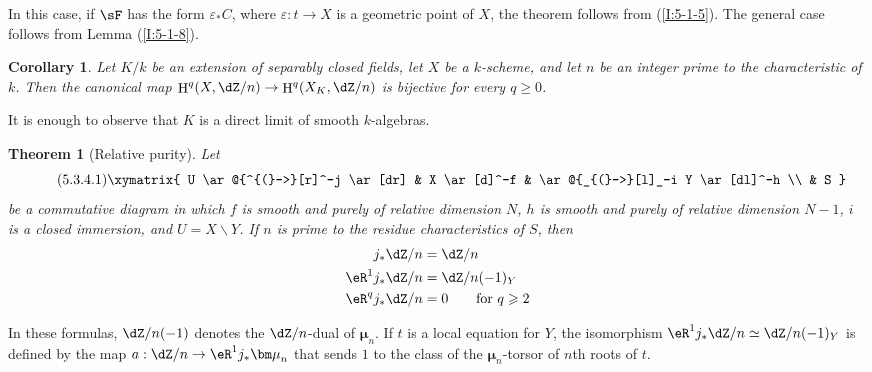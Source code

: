 \documentclass[12pt,oneside,english]{smfbook}
\DeclareMathOperator{\h}{H}
\newcommand{\dmu}{{\bm\mu}}
\newcounter{char}
\renewcommand{\setminus}{\smallsetminus}
\newtheorem{corollary}[subsubsection]{Corollary}
\newtheorem{theorem}[subsubsection]{Theorem}
\begin{document}
In this case, if $\sF$ has the form $\varepsilon_*C$, where $\varepsilon:t\to X$ is a geometric point of $X$, the theorem follows from (\ref{I:5-1-5}). The general case follows from Lemma (\ref{I:5-1-8}).

\begin{corollary}\label{I:5-3-3}
Let $K/k$ be an extension of separably closed fields, let $X$ be a $k$-scheme, and let $n$ be an integer prime to the characteristic of $k$. Then the canonical map $\h^q(X,\dZ/n)\to\h^q(X_K,\dZ/n)$ is bijective for every $q\geqslant0$.
\end{corollary}

It is enough to observe that $K$ is a direct limit of smooth $k$-algebras.

\begin{theorem}[Relative purity]\label{I:5-3-4}
Let
\begin{equation*}\tag{5.3.4.1}\label{I:eq:5-3-4-1}\xymatrix{
  U \ar@{^{(}->}[r]^-j \ar[dr]
    & X \ar[d]^-f
    & \ar@{_{(}->}[l]_-i Y \ar[dl]^-h \\
  & S
}\end{equation*}
be a commutative diagram in which $f$ is smooth and purely of relative dimension $N$, $h$ is smooth and purely of relative dimension $N-1$, $i$ is a closed immersion, and $U=X\setminus Y$. If $n$ is prime to the residue characteristics of $S$, then
\begin{equation*}
\begin{aligned}
  j_* \dZ/n     &= \dZ/n \\
  \eR^1 j_*\dZ/n &= \dZ/n(-1)_Y \\
  \eR^q j_*\dZ/n &= 0 \qquad \text{for $q\geqslant 2$}
\end{aligned}
\end{equation*}
\end{theorem}

In these formulas, $\dZ/n(-1)$ denotes the $\dZ/n$-dual of $\dmu_n$. If $t$ is a local equation for $Y$, the isomorphism $\eR^1j_*\dZ/n\simeq\dZ/n(-1)_Y$ is defined by the map $a:\dZ/n\to\eR^1j_*\dmu_n$ that sends $1$ to the class of the $\dmu_n$-torsor of $n$th roots of $t$.
\end{document}

